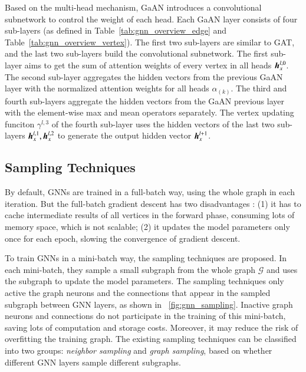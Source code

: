 Based on the multi-head mechanism, GaAN \cite{zhang2018_gaan} introduces a convolutional subnetwork to control the weight of each head.
%
Each GaAN layer consists of four sub-layers (as defined in Table~\ref{tab:gnn_overview_edge} and Table~\ref{tab:gnn_overview_vertex}).
%
The first two sub-layers are similar to GAT, and the last two sub-layers build the convolutional subnetwork.
%
The first sub-layer aims to get the sum of attention weights of every vertex in all heads $\boldsymbol{h}^{l,0}_x$.
The second sub-layer aggregates the hidden vectors from the previous GaAN layer with the normalized attention weights for all heads $\alpha_{(k)}$.
The third and fourth sub-layers aggregate the hidden vectors from the GaAN previous layer with the element-wise max and mean operators separately.
The vertex updating funciton $\gamma^{l,3}$ of the fourth sub-layer uses the hidden vectors of the last two sub-layers $\boldsymbol{h}^{l, 1}_x, \boldsymbol{h}^{l, 2}_x$ to generate the output hidden vector $\boldsymbol{h}^{l+1}_x$.

\subsection{Sampling Techniques}

By default, GNNs are trained in a full-batch way, using the whole graph in each iteration.
%
But the full-batch gradient descent has two disadvantages \cite{chiang2019_cluster_gcn}:
%
(1) it has to cache intermediate results of all vertices in the forward phase, consuming lots of memory space, which is not scalable;
%
(2) it updates the model parameters only once for each epoch, slowing the convergence of gradient descent.

To train GNNs in a mini-batch way, the sampling techniques \cite{hamilton2017_graphsage, ying2018_pinsage, chen2018_fastgcn, chen2018_sgcn, zeng2018_aesg, chiang2019_cluster_gcn, zeng2020_graphsaint} are proposed.
%
In each mini-batch, they sample a small subgraph from the whole graph $\mathcal{G}$ and uses the subgraph to update the model parameters.
%
The sampling techniques only active the graph neurons and the connections that appear in the sampled subgraph between GNN layers, as shown in \figurename~\ref{fig:gnn_sampling}.
%
Inactive graph neurons and connections do not participate in the training of this mini-batch, saving lots of computation and storage costs.
%
Moreover, it may reduce the risk of overfitting the training graph.
%
The existing sampling techniques can be classified into two groups: \emph{neighbor sampling} and \emph{graph sampling}, based on whether different GNN layers sample different subgraphs.

